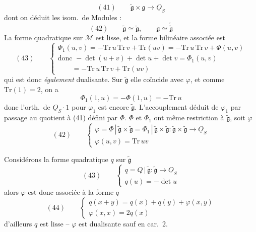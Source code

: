 \documentclass[11pt,a4paper]{article}
\begin{document}
\[
  (41) \qquad \widetilde{\mathfrak{g}} \times \mathfrak{g} \longrightarrow \underline{O}_S
\]
dont on déduit les isom.\ de Modules :
\[
  (42) \qquad \widetilde{\mathfrak{g}} \simeq \check{\mathfrak{g}}, \qquad
  \mathfrak{g} \simeq \check{\widetilde{\mathfrak{g}}}
\]
\struck{\ill{}} La forme quadratique  sur $\mathcal{M}$ est
lisse, et la forme bilinéaire associée est
\[
  (43) \qquad \left\lbrace
  \begin{array}{l}
    \Phi_1(u, v) = -\mathrm{Tr}\, u \,\mathrm{Tr}\, v + \mathrm{Tr}(uv) = -\mathrm{Tr}\, u \,\mathrm{Tr}\, v + \Phi(u, v) \\
    \text{donc } -\det(u + v) + \det u + \det v = \Phi_1(u, v) \\
    \qquad = -\mathrm{Tr}\, u \,\mathrm{Tr}\, v + \mathrm{Tr}(uv)
  \end{array}\right.
\]
qui est donc \emph{également} dualisante. Sur $\widetilde{\mathfrak{g}}$ elle
coïncide avec $\varphi$, et comme $\mathrm{Tr}(1) = 2$, on a
\[
  \Phi_1(1, u) = -\Phi(1, u) = -\mathrm{Tr}\, u
\]
donc l'orth.\ de $\underline{O}_S \cdot 1$ pour $\varphi_1$ est encore
$\widetilde{\mathfrak{g}}$. L'accouplement 
\struck{\ill{}} déduit de $\varphi_1$ par passage au quotient \ill{}
\struck{\ill{}}  à (41) défini par $\Phi$.
\struck{\ill{}}  $\Phi$ et $\Phi_1$ ont même restriction à
$\widetilde{\mathfrak{g}}$, \struck{\ill{}} soit $\varphi$
\[
  (42) \qquad \left\lbrace
  \begin{array}{l}
    \varphi = \Phi \,|\, \widetilde{\mathfrak{g}} \times \widetilde{\mathfrak{g}}
    = \Phi_1 \,|\, \widetilde{\mathfrak{g}} \times \widetilde{\mathfrak{g}} :
    \widetilde{\mathfrak{g}} \times \widetilde{\mathfrak{g}} \to \underline{O}_S \\
    \varphi(u, v) = \mathrm{Tr}\, uv
  \end{array}\right.
\]

Considérons la forme quadratique $q$ sur $\widetilde{\mathfrak{g}}$
\[
  (43) \qquad \left\lbrace
  \begin{array}{l}
    q = Q \,|\, \widetilde{\mathfrak{g}} : \widetilde{\mathfrak{g}} \longrightarrow \underline{O}_S \\
    q(u) = -\det u
  \end{array}\right.
\]
alors $\varphi$ est donc associée à la forme $q$
\[
  (44) \qquad \left\lbrace
  \begin{array}{l}
    q(x + y) = q(x) + q(y) + \varphi(x, y) \\
    \varphi(x, x) = 2 q(x)
  \end{array}\right.
\]
d'ailleurs $q$ est lisse -- $\varphi$ est dualisante sauf en car.~2.
\end{document}
